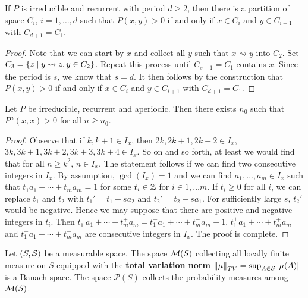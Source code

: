 \begin{proposition}
    If $P$ is irreducible and recurrent with period $d\geq 2$, then there 
    is a partition of space $C_i$, $i=1,\ldots,d$ such that $P(x,y)>0$ 
    if and only if $x\in C_i$ and $y\in C_{i+1}$ with $C_{d+1} = C_1$. 
\end{proposition}
\begin{proof}
    Note that we can start by $x$ and collect all $y$ such that $x\rightsquigarrow y$ 
    into $C_2$. Set $C_3 = \Set{z}{y\rightsquigarrow z, y\in C_2}$. 
    Repeat this process until $C_{s+1} = C_1$ contains $x$. Since the period 
    is $s$, we know that $s = d$. It then follows by the construction 
    that $P(x,y)>0$ if and only if $x\in C_i$ and $y\in C_{i+1}$ with $C_{d+1} = C_1$. 
\end{proof}

\begin{lemma}
    Let $P$ be irreducible, recurrent and aperiodic. Then there exists $n_0$ 
    such that $P^n(x,x)>0$ for all $n\geq n_0$. 
\end{lemma}
\begin{proof}
    Observe that if $k,k+1\in I_x$, then $2k,2k+1,2k+2\in I_x$, $3k,3k+1,3k+2,3k+3,3k+4\in I_x$. 
    So on and so forth, at least we would find that for all $n\geq k^2$, 
    $n\in I_x$. The statement follows if we can find two consecutive integers 
    in $I_x$. By assumption, $\gcd(I_x) = 1$ and we can find $a_1,\ldots,a_m\in I_x$ 
    such that $t_1a_1 + \cdots + t_ma_m = 1$ for some $t_i\in\Z$ for $i\in 1,\ldots m$. 
    If $t_i\geq 0$ for all $i$, we can replace $t_1$ and $t_2$ with 
    $t_1' = t_1 + sa_2$ and $t_2' = t_2 - sa_1$. For sufficiently large $s$, 
    $t_2'$ would be negative. Hence we may suppose that there are positive 
    and negative integers in $t_i$. Then $t_1^+a_1 + \cdots + t_m^+a_m 
    = t_1^-a_1 + \cdots + t_m^-a_m + 1$. $t_1^+a_1 + \cdots + t_m^+a_m$ and 
    $t_1^-a_1 + \cdots + t_m^-a_m$ are consecutive integers in $I_x$. 
    The proof is complete. 
\end{proof}

\begin{definition}
    Let $(S,\S)$ be a measurable space. The space $\M(S)$ collecting all 
    locally finite measure on $S$ equipped with the \textbf{total variation 
    norm} $\norm{\mu}_{TV} = \sup_{A\in \S}\abs{\mu(A)}$ is a Banach space. 
    The space $\mathcal{P}(S)$ collects the probability measures among 
    $\M(S)$. 
\end{definition}

